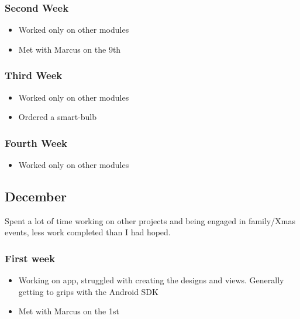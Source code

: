\subsubsection*{Second Week}\label{second-week-1}

\begin{itemize}
\tightlist
\item
  Worked only on other modules
\item
  Met with Marcus on the 9th
\end{itemize}

\subsubsection*{Third Week}\label{third-week}

\begin{itemize}
\tightlist
\item
  Worked only on other modules
\item
  Ordered a smart-bulb
\end{itemize}

\subsubsection*{Fourth Week}\label{fourth-week}

\begin{itemize}
\tightlist
\item
  Worked only on other modules
\end{itemize}

\subsection{December}\label{december}

Spent a lot of time working on other projects and being engaged in
family/Xmas events, less work completed than I had hoped.

\subsubsection*{First week}\label{first-week-2}

\begin{itemize}
\tightlist
\item
  Working on app, struggled with creating the designs and views.
  Generally getting to grips with the Android SDK
\item
  Met with Marcus on the 1st

\end{itemize}

